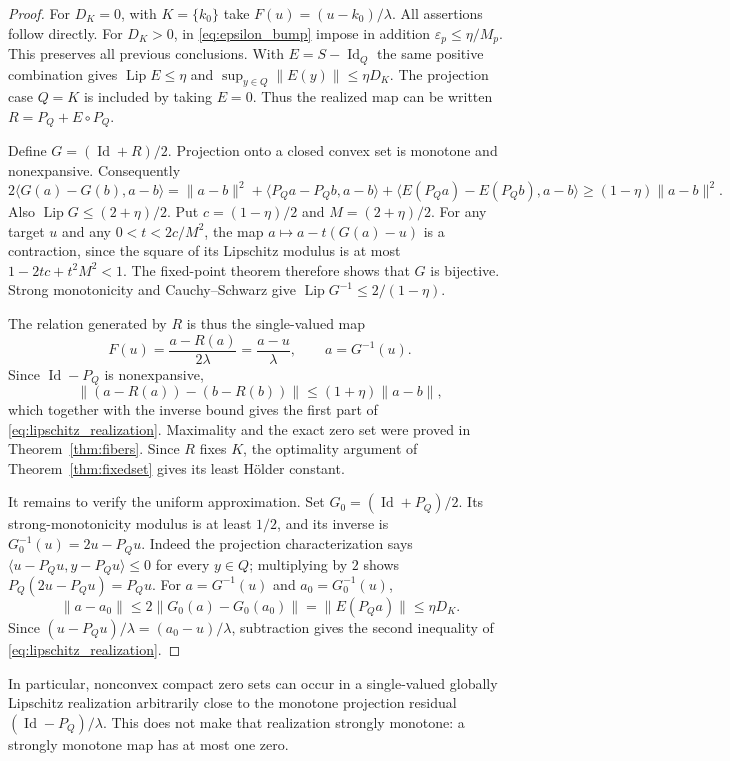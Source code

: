 \documentclass[11pt]{article}
\numberwithin{equation}{section}
\theoremstyle{definition}
\theoremstyle{remark}
\newcommand{\Lip}{\operatorname{Lip}}
\newcommand{\Id}{\operatorname{Id}}
\newcommand{\ip}[2]{\langle #1,#2\rangle}
\newcommand{\norm}[1]{\lVert #1\rVert}
\newcommand{\eps}{\varepsilon}
\begin{document}
\begin{proof}
For $D_K=0$, with $K=\{k_0\}$ take $F(u)=(u-k_0)/\lambda$.
All assertions follow directly. For $D_K>0$, in
\eqref{eq:epsilon_bump} impose in addition $\eps_p\le\eta/M_p$.
This preserves all previous conclusions. With $E=S-\Id_Q$ the same
positive combination gives
$\Lip E\le\eta$ and $\sup_{y\in Q}\norm{E(y)}\le\eta D_K$.
The projection case $Q=K$ is included by taking $E=0$.
Thus the realized map can be written
$R=P_Q+E\circ P_Q$.

Define $G=(\Id+R)/2$. Projection onto a closed convex set is monotone
and nonexpansive. Consequently
\[
 2\ip{G(a)-G(b)}{a-b}
 =\norm{a-b}^2+\ip{P_Qa-P_Qb}{a-b}
   +\ip{E(P_Qa)-E(P_Qb)}{a-b}
 \ge(1-\eta)\norm{a-b}^2.
\]
Also $\Lip G\le(2+\eta)/2$. Put $c=(1-\eta)/2$ and
$M=(2+\eta)/2$. For any target $u$ and any $0<t<2c/M^2$, the map
$a\mapsto a-t(G(a)-u)$ is a contraction, since the square of its
Lipschitz modulus is at most $1-2tc+t^2M^2<1$. The fixed-point theorem
therefore shows that $G$ is bijective. Strong monotonicity and
Cauchy--Schwarz give $\Lip G^{-1}\le2/(1-\eta)$.

The relation generated by $R$ is thus the single-valued map
\[
 F(u)=\frac{a-R(a)}{2\lambda}=\frac{a-u}{\lambda},
 \qquad a=G^{-1}(u).
\]
Since $\Id-P_Q$ is nonexpansive,
\[
 \norm{(a-R(a))-(b-R(b))}\le(1+\eta)\norm{a-b},
\]
which together with the inverse bound gives the first part of
\eqref{eq:lipschitz_realization}. Maximality and the exact zero set
were proved in Theorem~\ref{thm:fibers}. Since $R$ fixes $K$, the
optimality argument of Theorem~\ref{thm:fixedset} gives its least
H\"older constant.

It remains to verify the uniform approximation. Set
$G_0=(\Id+P_Q)/2$. Its strong-monotonicity modulus is at least $1/2$,
and its inverse is $G_0^{-1}(u)=2u-P_Qu$. Indeed the projection
characterization says $\ip{u-P_Qu}{y-P_Qu}\le0$ for every $y\in Q$;
multiplying by $2$ shows $P_Q(2u-P_Qu)=P_Qu$.
For $a=G^{-1}(u)$ and $a_0=G_0^{-1}(u)$,
\[
 \norm{a-a_0}
 \le2\norm{G_0(a)-G_0(a_0)}
 =\norm{E(P_Qa)}\le\eta D_K.
\]
Since $(u-P_Qu)/\lambda=(a_0-u)/\lambda$, subtraction gives the
second inequality of \eqref{eq:lipschitz_realization}.
\end{proof}

In particular, nonconvex compact zero sets can occur in a single-valued
globally Lipschitz realization arbitrarily close to the monotone
projection residual $(\Id-P_Q)/\lambda$. This does not make that
realization strongly monotone: a strongly monotone map has at most one
zero.
\end{document}
